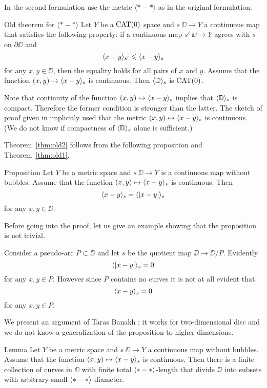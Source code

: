 In the second formulation use the metric $\langle{*}-{*}\rangle$ as in the original formulation.

\begin{thm}{Old theorem for $\bm{\langle{*}-{*}\rangle}$}\label{thm:old2}
Let $Y$ be a $\mathop{\rm CAT}\nolimits(0)$ space and $s\:\DD\to Y$ a continuous map that satisfies the following property: 
if a continuous map $s'\:\DD\to Y$ agrees with $s$ on $\partial\DD$ and
\[\langle x-y\rangle_{s'}\leqslant \langle x-y\rangle_{s}\]
for any $x,y\in \DD$,
then the equality holds for all pairs of $x$ and $y$.
Assume that the function $(x,y)\mapsto\langle x-y\rangle_{s}$ is continuous.
Then $\langle\mathbb{D}\rangle_s$ is $\mathop{\rm CAT}\nolimits(0)$.
\end{thm}

Note that continuity of the function $(x,y)\mapsto\langle x-y\rangle_{s}$
implies that $\langle\mathbb{D}\rangle_s$ is compact.
Therefore the former condition is stronger than the latter.  
The sketch of proof given in \cite{petrunin-metric-min} implicitly used that the metric $(x,y)\zz\mapsto\<x-y\>_{s}$ is continuous.
(We do not know if compactness of $\langle\mathbb{D}\rangle_s$ alone is sufficient.)

Theorem~\ref{thm:old2} follows from the following proposition and Theorem~\ref{thm:old1}.
 
\begin{thm}{Proposition}\label{prop:<||>=<>}
Let $Y$ be a metric space and $s\:\DD\to Y$ is a continuous map without bubbles.
Assume that the function $(x,y)\mapsto \langle x-y\rangle_s$ is continuous.
Then 
\[\langle x-y\rangle_s=\langle|x-y|\rangle_s\]
for any $x,y\in \DD$.
\end{thm}

Before going into the proof, let us give an example showing that the proposition is not trivial.

Consider a pseudo-arc $P\subset \DD$ and let $s$ be the quotient map $\DD\to \DD/P$.
Evidently 
\[\langle|x-y|\rangle_s=0\]
for any $x,y\in P$.
However since $P$ contains no curves it is not at all evident that 
\[\langle x-y\rangle_s=0\]
for any $x,y\in P$.

We present an argument of Taras Banakh \cite{banakh};
it works for two-dimensional disc and we do not know a generalization of the proposition to higher dimensions.

\begin{thm}{Lemma}\label{lem:subdivision}
Let $Y$ be a metric space and $s\:\DD\to Y$ a continuous map without bubbles.
Assume that the function $(x,y)\mapsto \langle x-y\rangle_s$ is continuous.
Then there is a finite collection of curves in $\DD$ with finite total $\langle{*}-{*}\rangle$-length 
that divide $\DD$ into subsets with arbitrary small $\langle{*}-{*}\rangle$-diameter.
\end{thm}

